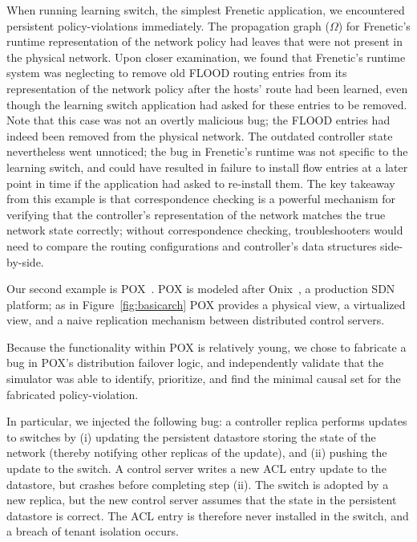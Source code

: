When running learning switch, the simplest Frenetic application, we encountered
persistent policy-violations immediately. The propagation graph ($\Omega$) for Frenetic's
runtime representation of the network policy had leaves that were not present
in the physical network. Upon closer examination, we found that Frenetic's
runtime system was neglecting to remove old FLOOD routing entries from its
representation of the network policy after the hosts' route had been learned,
even though the learning switch application had
asked for these entries to be removed. Note that this case was not an overtly
malicious bug; the FLOOD entries had indeed been removed from the physical
network. The outdated controller state nevertheless went unnoticed; the bug in
Frenetic's runtime was not specific to the learning switch, and could have
resulted in failure to install flow entries at a later point in time if the
application had asked to re-install them. The key takeaway from this example
is that correspondence checking is a powerful mechanism for
verifying that the controller's representation of the network matches the true
network state correctly; without correspondence checking, troubleshooters
would need to compare the routing configurations and controller's data
structures side-by-side.

 Our second example is POX~\cite{pox}. POX is modeled after
Onix~\cite{onix}, a production SDN platform; as in Figure~\ref{fig:basicarch} 
POX provides a physical view, a virtualized view, and a naive replication
mechanism between distributed control servers.

Because the functionality within POX is relatively young, we chose to
fabricate a bug in POX's distribution failover logic, and independently
validate that the simulator was able to identify, prioritize, and find the
minimal causal set for the fabricated policy-violation.

In particular, we injected the following bug: a controller replica performs
updates to switches by (i) updating the persistent datastore storing the state
of the network (thereby notifying other replicas of the update), and (ii) pushing the
update to the switch. A control server writes a new ACL entry update to the datastore, but crashes
before completing step (ii). The switch is adopted by a new replica,
but the new control server assumes that the state in the persistent datastore
is correct. The ACL entry is therefore never installed in the switch, and a
breach of tenant isolation occurs. 

